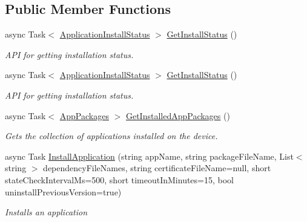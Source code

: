 \subsection*{Public Member Functions}
\begin{DoxyCompactItemize}
\item 
async Task$<$ \hyperlink{namespace_microsoft_1_1_tools_1_1_windows_device_portal_a6d809b60c74a8dfeca3698554f0afb6d}{Application\+Install\+Status} $>$ \hyperlink{class_microsoft_1_1_tools_1_1_windows_device_portal_1_1_device_portal_a43e13615811dc28fea8b56da1f420478}{Get\+Install\+Status} ()
\begin{DoxyCompactList}\small\item\em A\+PI for getting installation status. \end{DoxyCompactList}\item 
async Task$<$ \hyperlink{namespace_microsoft_1_1_tools_1_1_windows_device_portal_a6d809b60c74a8dfeca3698554f0afb6d}{Application\+Install\+Status} $>$ \hyperlink{class_microsoft_1_1_tools_1_1_windows_device_portal_1_1_device_portal_a43e13615811dc28fea8b56da1f420478}{Get\+Install\+Status} ()
\begin{DoxyCompactList}\small\item\em A\+PI for getting installation status. \end{DoxyCompactList}\item 
async Task$<$ \hyperlink{class_microsoft_1_1_tools_1_1_windows_device_portal_1_1_device_portal_1_1_app_packages}{App\+Packages} $>$ \hyperlink{class_microsoft_1_1_tools_1_1_windows_device_portal_1_1_device_portal_affe28db310d3838db5f4114890bc5773}{Get\+Installed\+App\+Packages} ()
\begin{DoxyCompactList}\small\item\em Gets the collection of applications installed on the device. \end{DoxyCompactList}\item 
async Task \hyperlink{class_microsoft_1_1_tools_1_1_windows_device_portal_1_1_device_portal_a808f9262ed0353a666962033c6cd4ff2}{Install\+Application} (string app\+Name, string package\+File\+Name, List$<$ string $>$ dependency\+File\+Names, string certificate\+File\+Name=null, short state\+Check\+Interval\+Ms=500, short timeout\+In\+Minutes=15, bool uninstall\+Previous\+Version=true)
\begin{DoxyCompactList}\small\item\em Installs an application \end{DoxyCompactList}\item 

\end{DoxyCompactItemize}

